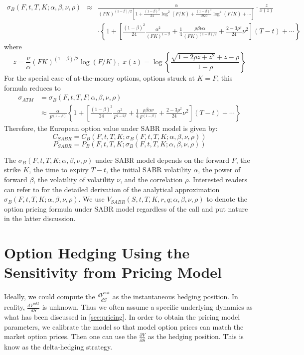 \documentclass[letterpaper,12pt,titlepage,oneside,final]{book}
\numberwithin{equation}{section}
\theoremstyle{definition}
\newcommand{\Vmkt}{V^{mkt}}
\begin{document}
\begin{eqnarray*}
	\sigma_{B}(F,t,T,K;\alpha,\beta,\nu,\rho) &\approx&
	\frac{\alpha}{(FK)^{(1-\beta)/2}\left[1+\frac{(1-\beta)^2}{24}\log^2(F/K)
		+ \frac{(1-\beta)^4}{1920}\log^4(F/K) + \cdots\right]} \cdot
	\frac{z}{x(z)}  \\
	& & \cdot \left\{1+\left[\frac{(1-\beta)^2}{24}\frac{\alpha^2}{(FK)^{1-\beta}}
	+ \frac{1}{4} \frac{\rho\beta\nu\alpha}{(FK)^{(1-\beta)/2}} +
	\frac{2-3\rho^2}{24}\nu^2 \right](T-t)+\cdots\right\}
\end{eqnarray*}
where
\[
z = \frac{\nu}{\alpha}(FK)^{(1-\beta)/2}\log (F/K),\; x(z) =
\log\left\{\frac{\sqrt{1-2\rho z + z^2}+z-\rho}{1-\rho}\right\}
\]
For the special case of at-the-money options, options struck at $K=F$,
this formula reduces to
\[
\begin{split}
\sigma_{ATM} &= \sigma_{B}(F,t,T,F;\alpha,\beta,\nu,\rho) \\
&\approx
\frac{\alpha}{F^{(1-\beta)}}\left\{1 +
\left[\frac{(1-\beta)^2}{24}\frac{\alpha^2}{F^{2-2\beta}} +
\frac{1}{4}\frac{\rho\beta\alpha\nu}{F^{(1-\beta)}} +
\frac{2-3\rho^2}{24}\nu^2 \right] (T-t) + \cdots \right\}
\end{split}
\]
Therefore, the European option value under SABR model is given by:
\[
C_{SABR}=C_B(F,t,T,K;\sigma_{B}(F,t,T,K;\alpha,\beta,\nu,\rho))
\]
\[
P_{SABR}=P_B(F,t,T,K;\sigma_{B}(F,t,T,K;\alpha,\beta,\nu,\rho))
\]

The $\sigma_{B}(F,t,T,K;\alpha,\beta,\nu,\rho)$ under SABR model depends on the forward $F$, the strike $K$, the time to expiry $T-t$, the initial SABR volatility $\alpha$, the power of forward $\beta$, the volatility of volatility $\nu$, and the correlation $\rho$.  Interested readers can refer to \cite{hagan2002managing} for the detailed derivation of the analytical approximation $\sigma_{B}(F,t,T,K;\alpha,\beta,\nu,\rho)$.  We use $V_{SABR}(S,t,T,K,r,q;\alpha,\beta,\nu,\rho)$ to denote the option pricing formula under SABR model regardless of the call and put nature in the latter discussion.



\section{Option Hedging Using the Sensitivity from Pricing Model}
 Ideally, we could compute the $\frac{d \Vmkt}{d S}$ as the instantaneous hedging position. In reality, $\frac{d \Vmkt}{d S}$ is unknown. Thus we often assume a specific underlying dynamics as what has been discussed in \ref{sec:pricing}. In order to obtain the pricing model parameters, we calibrate the model so that model option prices can match the market option prices. Then one can use the $\frac{\partial V}{\partial S}$ as the hedging position. This is know as the delta-hedging strategy.
\end{document}

